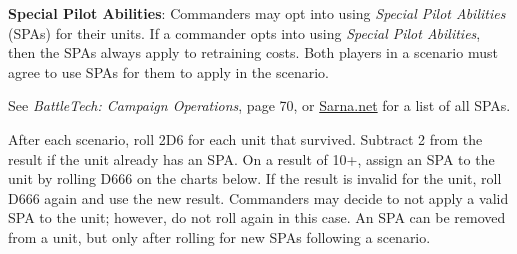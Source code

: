 \item {\bfseries Special Pilot Abilities}: Commanders may opt into using \emph{Special Pilot Abilities} (SPAs) for their units.
If a commander opts into using \emph{Special Pilot Abilities}, then the SPAs always apply to retraining costs.
Both players in a scenario must agree to use SPAs for them to apply in the scenario.

See \emph{BattleTech: Campaign Operations}, page 70, or \href{https://sarna.net}{Sarna.net} for a list of all SPAs.

After each scenario, roll 2D6 for each unit that survived.
Subtract 2 from the result if the unit already has an SPA.
On a result of 10+, assign an SPA to the unit by rolling D666 on the charts below.
If the result is invalid for the unit, roll D666 again and use the new result.
Commanders may decide to not apply a valid SPA to the unit; however, do not roll again in this case.
An SPA can be removed from a unit, but only after rolling for new SPAs following a scenario.
